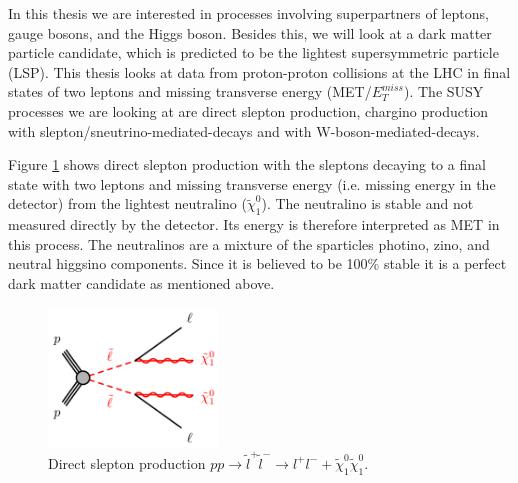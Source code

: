 

In this thesis we are interested in processes involving superpartners of leptons, gauge bosons, and the Higgs boson. Besides this, we will look at a dark matter particle candidate, which is predicted to be the lightest supersymmetric particle (LSP). This thesis looks at data from proton-proton collisions at the LHC in final states of two leptons and missing transverse energy (MET/$E_T^{miss}$). The SUSY processes we are looking at are direct slepton production, chargino production with slepton/sneutrino-mediated-decays and with W-boson-mediated-decays. 

Figure \ref{fig:SlepSlepFeynman} shows direct slepton production with the sleptons decaying to a final state with two leptons and missing transverse energy (i.e. missing energy in the detector) from the lightest neutralino ($\tilde{\chi}_1^0$). The neutralino is stable and not measured directly by the detector. Its energy is therefore interpreted as MET in this process. The neutralinos are a mixture of the sparticles photino, zino, and neutral higgsino components. Since it is believed to be 100\% stable  it is a perfect dark matter candidate as mentioned above.  
\begin{figure}[H]
    \centering
    \includegraphics[width = 0.4\textwidth]{Figures/FeynmanDiagrams/SlepSlepFeynman.png}
    \caption{Direct slepton production $pp \rightarrow \tilde{l}^+ \tilde{l}^- \rightarrow l^+l^- + \tilde{\chi}_1^0 \tilde{\chi}_1^0$.}
    \label{fig:SlepSlepFeynman}
\end{figure}

